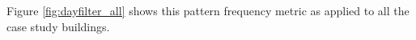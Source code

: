 Figure \ref{fig:dayfilter_all} shows this pattern frequency metric as applied to all the case study buildings.